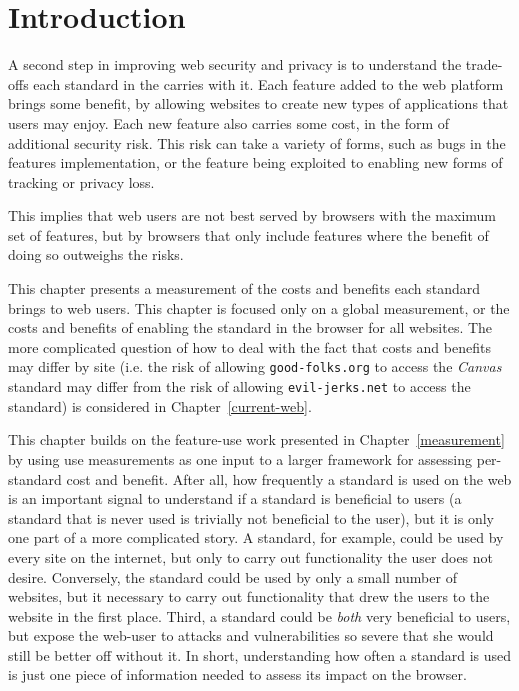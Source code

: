 \section{Introduction}
\label{cost-benefit:introduction}

A second step in improving web security and privacy is to understand the
trade-offs each standard in the \WAPI carries with it.
Each feature added to the web platform brings some benefit,
by allowing websites to create new types of applications that users
may enjoy.  Each new feature also carries some cost, in the form of additional
security risk.  This risk can take a variety of forms, such as bugs in the
features implementation, or the feature being exploited to enabling new forms
of tracking or privacy loss.

This implies that web users are not best served by browsers with the maximum
set of features, but by browsers that only include features where the benefit
of doing so outweighs the risks.

This chapter presents a measurement of the costs and benefits each standard
brings to web users.  This chapter is focused only on a global measurement,
or the costs and benefits of enabling the standard in the browser for all
websites.  The more complicated question of how to deal with the fact that
costs and benefits may differ by site (i.e. the risk of allowing
\texttt{good-folks.org} to access the \textit{Canvas} standard may differ
from the risk of allowing \texttt{evil-jerks.net} to access the standard)
is considered in Chapter~\ref{current-web}.

This chapter builds on the feature-use work presented in
Chapter~\ref{measurement} by using \WAPI use measurements as one input to a
larger framework for assessing per-standard cost and benefit. After all, how
frequently a standard is used on the web is an important signal to understand
if a standard is beneficial to users (a \WAPI standard that is never used is
trivially not beneficial to the user), but it is only one part of a more
complicated story.  A standard, for example, could be used by every site on the
internet, but only to carry out functionality the user does not desire.
Conversely, the standard could be used by only a small number of websites, but
it necessary to carry out functionality that drew the users to the website in
the first place.  Third, a standard could be \emph{both} very beneficial to
users, but expose the web-user to attacks and vulnerabilities so severe that
she would still be better off without it.  In short, understanding how often a
\WAPI standard is used is just one piece of information needed to assess its
impact on the browser.

